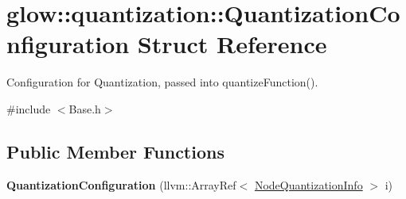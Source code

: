 \hypertarget{structglow_1_1quantization_1_1_quantization_configuration}{}\section{glow\+:\+:quantization\+:\+:Quantization\+Configuration Struct Reference}
\label{structglow_1_1quantization_1_1_quantization_configuration}


Configuration for Quantization, passed into quantize\+Function().  




{\ttfamily \#include $<$Base.\+h$>$}

\subsection*{Public Member Functions}
\begin{DoxyCompactItemize}
\item 
\mbox{\label{structglow_1_1quantization_1_1_quantization_configuration_a3342ce64b04d677a602fe8d598c9a829}} 
{\bfseries Quantization\+Configuration} (llvm\+::\+Array\+Ref$<$ \hyperlink{structglow_1_1_node_quantization_info}{Node\+Quantization\+Info} $>$ i)
\end{DoxyCompactItemize}
